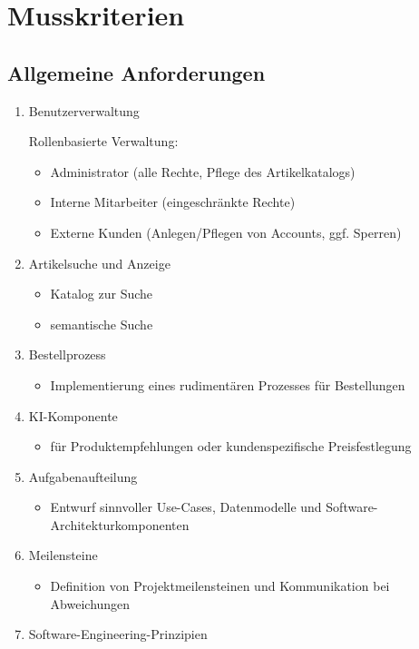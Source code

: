 \documentclass[%
	ngerman,
	12pt,
	a4paper
]{scrbook}
\begin{document}
\section{Musskriterien}
	\subsection{Allgemeine Anforderungen}
	\begin{enumerate}
		\item Benutzerverwaltung

		Rollenbasierte Verwaltung:
		\begin{itemize}
			\item Administrator (alle Rechte, Pflege des Artikelkatalogs)
			\item Interne Mitarbeiter (eingeschränkte Rechte)
			\item Externe Kunden (Anlegen/Pflegen von Accounts, ggf. Sperren)
		\end{itemize}
		\item Artikelsuche und Anzeige
		\begin{itemize}
			\item Katalog zur Suche
			\item semantische Suche
		\end{itemize}
		\item Bestellprozess
		\begin{itemize}
			\item Implementierung eines rudimentären Prozesses für Bestellungen
		\end{itemize}
		\item KI-Komponente
		\begin{itemize}
			\item für Produktempfehlungen oder kundenspezifische Preisfestlegung
		\end{itemize}
		\item Aufgabenaufteilung
		\begin{itemize}
			\item Entwurf sinnvoller Use-Cases, Datenmodelle und Software-Architekturkomponenten
		\end{itemize}
		\item Meilensteine
		\begin{itemize}
			\item Definition von Projektmeilensteinen und Kommunikation bei Abweichungen
		\end{itemize}
		\item Software-Engineering-Prinzipien
		\begin{itemize}

\end{itemize}
\end{enumerate}
\end{document}
